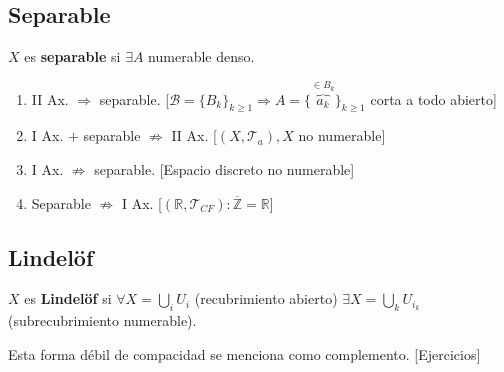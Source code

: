 \subsection{Separable}%
\label{sub:separable}
\begin{defi}[Separable]
$X$ es \textbf{separable} si $\exists A$ numerable denso.
\end{defi}
\begin{obs}
\begin{enumerate}
    \item II Ax. $\Rightarrow$ separable. [$\mathcal{B} = \{B_k\}_{k \ge 1} \Rightarrow A = \{\overbrace{a_k}^{\in B_k}\}_{k \ge 1}$ corta a todo abierto]
    \item I Ax. $+$ separable $\not \Rightarrow$ II Ax. [$\left( X, \mathcal{T}_a \right), X$ no numerable]
    \item I Ax. $\not \Rightarrow$ separable. [Espacio discreto no numerable]
    \item Separable $\not \Rightarrow$ I Ax. [$\left( \mathbb{R}, \mathcal{T}_{CF} \right) : \overline{\mathbb{Z}} = \mathbb{R}$]
\end{enumerate}
\end{obs}

\subsection{Lindelöf}%
\label{sub:lindelof}
\begin{defi}[Lindelöf]
$X$ es \textbf{Lindelöf} si $\forall X = \bigcup_{i} U_i$ (recubrimiento abierto) $\exists X = \bigcup_{k} U_{i_k}$ (subrecubrimiento numerable). 
\end{defi}

Esta forma débil de compacidad se menciona como complemento. [Ejercicios]


